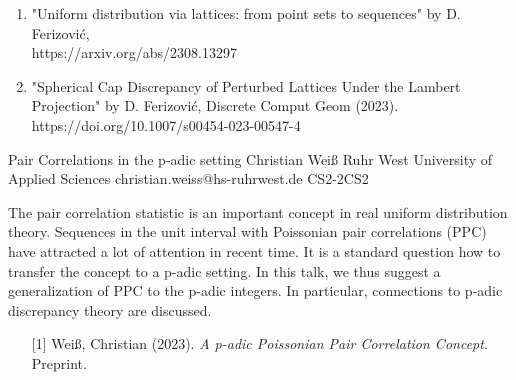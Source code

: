 \begin{talk}
	
		
		\begin{enumerate}
			\item  "Uniform distribution via lattices: from point sets to sequences" by D. Ferizovi\'{c},\\
			 https://arxiv.org/abs/2308.13297
			\item  "Spherical Cap Discrepancy of Perturbed Lattices Under the Lambert Projection" by D. Ferizovi\'{c}, Discrete Comput Geom (2023).\\ https://doi.org/10.1007/s00454-023-00547-4
		\end{enumerate}
		\end{talk}

\begin{talk}
  {Pair Correlations in the p-adic setting}%
  {Christian Wei\ss{}}%
  {Ruhr West University of Applied Sciences}%
  {christian.weiss@hs-ruhrwest.de}%
  {}%
{}{}{CS2-2}{CS2}

			
The pair correlation statistic is an important concept in real uniform distribution theory. Sequences in the unit interval with Poissonian pair correlations (PPC) have attracted a lot of attention in recent time. It is a standard question how to transfer the concept to a p-adic setting. In this talk, we thus suggest a generalization of PPC to the p-adic integers. In particular, connections to p-adic discrepancy theory are discussed.

\medskip
\begin{enumerate}
	\item[{[1]}] Wei\ss{}, Christian (2023). {\it A p-adic Poissonian Pair Correlation Concept}. Preprint.
\end{enumerate}

\end{talk}

